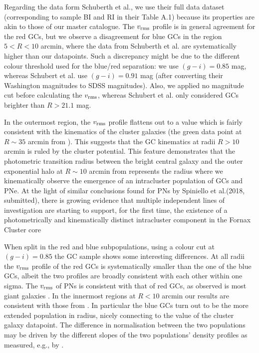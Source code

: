 \documentclass[useAMS,usenatbib]{mn2e}
\begin{document}
Regarding the data form Schuberth et al., we use their full data dataset (corresponding to 
sample BI and RI in their Table A.1) because its properties are akin to those of our master catalogue.
The $v_{\rm rms}$ profile is in general agreement for the red GCs, but we
observe a disagreement for blue GCs in the region $5<R<10$ arcmin, where the data from 
Schuberth et al. are systematically higher than our datapoints. Such a discrepancy
might be due to the different colour threshold used for the blue/red separation: we
use $(g-i) = 0.85$ mag, whereas Schubert et al. use $(g-i) = 0.91$ mag (after converting
their Washington magnitudes to SDSS magnitudes). Also, we applied no magnitude cut before
calculating the $v_{\rm rms}$, whereas Schubert et al. only considered GCs brighter than $R>21.1$ mag.

In the outermost region, the $v_{\rm rms}$ profile flattens out to a value which is 
fairly consistent with the kinematics of the cluster galaxies (the green data 
point at $R\sim35$ arcmin from \citealt{Drinkwater00}). This suggests that the GC 
kinematics at radii $R>10$ arcmin is ruled by the cluster potential. 
This feature demonstrates that the photometric transition radius 
between the bright central galaxy and the outer exponential halo at $R\sim10$ 
arcmin from \citet{Iodice16} represents the radius where we kinematically observe the 
emergence of an intracluster population of GCs and PNe. 
At the light of similar conclusions found for PNs by Spiniello et al.(2018, submitted), 
there is  growing evidence that multiple independent lines of investigation 
are starting to support, for the first time, the existence of a photometrically 
and kinematically distinct intracluster component in the Fornax Cluster core

When split in the red and blue subpopulations, using a colour cut at $(g - i) = 0.85$ 
the GC sample shows some interesting differences. At all radii the $v_{\rm rms}$ 
profile of the red GCs is systematically smaller than the one of the blue GCs, 
albeit the two profiles are broadly consistent with each other within one sigma. 
The $v_{\rm rms}$ of PNs is consistent with that of red GCs, as observed is 
most giant galaxies \citep[e.g.,][]{Pota13}.
In the innermost regions at $R < 10$ arcmin our results are consistent with  
those from \citet{Schuberth}. In particular the blue GCs turn out to 
be the more extended population in radius, nicely connecting to the value of 
the cluster galaxy datapoint. The difference in normalisation between the two 
populations may be driven by the different slopes of the two 
populations' density profiles as measured, e.g., by 
\citep[][their Eq. 10 and 11 and Table 5]{Schuberth}. 
\end{document}
